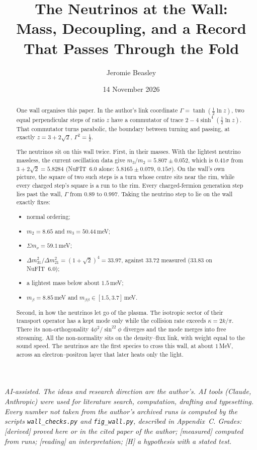 \documentclass[11pt]{article}
\title{The Neutrinos at the Wall:\\ Mass, Decoupling, and a Record That Passes Through the Fold}
\author{Jeromie Beasley}
\date{14 November 2026}
\theoremstyle{definition}\newtheorem{hypothesis}{Hypothesis}\newtheorem{prediction}{Prediction}
\theoremstyle{remark}\newtheorem{remark}[theorem]{Remark}
\newcommand{\grade}[1]{\textsf{\small[#1]}}
\begin{document}
\maketitle

\noindent\emph{AI-assisted. The ideas and research direction are the author's. AI tools (Claude, Anthropic) were used for literature search, computation, drafting and typesetting. Every number not taken from the author's archived runs is computed by the scripts \texttt{wall\_checks.py} and \texttt{fig\_wall.py}, described in Appendix~C. Grades: \grade{derived} proved here or in the cited paper of the author; \grade{measured} computed from runs; \grade{reading} an interpretation; \grade{H} a hypothesis with a stated test.}

\begin{abstract}
One wall organises this paper. In the author's link coordinate $\Gamma=\tanh(\tfrac12\ln z)$, two equal perpendicular steps of ratio $z$ have a commutator of trace $2-4\sinh^4(\tfrac12\ln z)$. That commutator turns parabolic, the boundary between turning and passing, at exactly $z=3+2\sqrt2$, $\Gamma^2=\tfrac12$.

The neutrinos sit on this wall twice. First, in their masses. With the lightest neutrino massless, the current oscillation data give $m_3/m_2=5.807\pm0.052$, which is $0.41\sigma$ from $3+2\sqrt2=5.8284$ (NuFIT~6.0 alone: $5.8165\pm0.079$, $0.15\sigma$). On the wall's own picture, the square of two such steps is a turn whose centre sits near the rim, while every charged step's square is a run to the rim. Every charged-fermion generation step lies past the wall, $\Gamma$ from $0.89$ to $0.997$. Taking the neutrino step to lie on the wall exactly fixes:
\begin{itemize}[nosep]
\item normal ordering;
\item $m_2=8.65$ and $m_3=50.44$\,meV;
\item $\Sigma m_\nu=59.1$\,meV;
\item $\Delta m^2_{31}/\Delta m^2_{21}=(1+\sqrt2)^4=33.97$, against $33.72$ measured ($33.83$ on NuFIT~6.0);
\item a lightest mass below about $1.5$\,meV;
\item $m_\beta=8.85$\,meV and $m_{\beta\beta}\in[1.5,3.7]$\,meV.
\end{itemize}

Second, in how the neutrinos let go of the plasma. The isotropic sector of their transport operator has a kept mode only while the collision rate exceeds $\kappa=2k/\pi$. There its non-orthogonality $4\phi^2/\sin^22\phi$ diverges and the mode merges into free streaming. All the non-normality sits on the density--flux link, with weight equal to the sound speed. The neutrinos are the first species to cross this wall, at about $1$\,MeV, across an electron--positron layer that later heats only the light.


\end{abstract}
\end{document}
